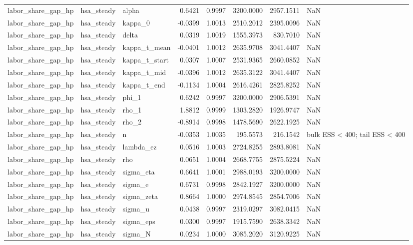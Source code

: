 \begin{tabular}{lllrrrrl}
labor\_share\_gap\_hp & hsa\_steady & alpha & 0.6421 & 0.9997 & 3200.0000 & 2957.1511 & NaN \\
labor\_share\_gap\_hp & hsa\_steady & kappa\_0 & -0.0399 & 1.0013 & 2510.2012 & 2395.0096 & NaN \\
labor\_share\_gap\_hp & hsa\_steady & delta & 0.0319 & 1.0019 & 1555.3973 & 830.7010 & NaN \\
labor\_share\_gap\_hp & hsa\_steady & kappa\_t\_mean & -0.0401 & 1.0012 & 2635.9708 & 3041.4407 & NaN \\
labor\_share\_gap\_hp & hsa\_steady & kappa\_t\_start & 0.0307 & 1.0007 & 2531.9365 & 2660.0852 & NaN \\
labor\_share\_gap\_hp & hsa\_steady & kappa\_t\_mid & -0.0396 & 1.0012 & 2635.3122 & 3041.4407 & NaN \\
labor\_share\_gap\_hp & hsa\_steady & kappa\_t\_end & -0.1134 & 1.0004 & 2616.4261 & 2825.8252 & NaN \\
labor\_share\_gap\_hp & hsa\_steady & phi\_1 & 0.6242 & 0.9997 & 3200.0000 & 2906.5391 & NaN \\
labor\_share\_gap\_hp & hsa\_steady & rho\_1 & 1.8812 & 0.9999 & 1303.2820 & 1926.9747 & NaN \\
labor\_share\_gap\_hp & hsa\_steady & rho\_2 & -0.8914 & 0.9998 & 1478.5690 & 2622.1925 & NaN \\
labor\_share\_gap\_hp & hsa\_steady & n & -0.0353 & 1.0035 & 195.5573 & 216.1542 & bulk ESS < 400; tail ESS < 400 \\
labor\_share\_gap\_hp & hsa\_steady & lambda\_ez & 0.0516 & 1.0003 & 2724.8255 & 2893.8081 & NaN \\
labor\_share\_gap\_hp & hsa\_steady & rho & 0.0651 & 1.0004 & 2668.7755 & 2875.5224 & NaN \\
labor\_share\_gap\_hp & hsa\_steady & sigma\_eta & 0.6641 & 1.0001 & 2988.0193 & 3200.0000 & NaN \\
labor\_share\_gap\_hp & hsa\_steady & sigma\_e & 0.6731 & 0.9998 & 2842.1927 & 3200.0000 & NaN \\
labor\_share\_gap\_hp & hsa\_steady & sigma\_zeta & 0.8664 & 1.0000 & 2974.8545 & 2854.7006 & NaN \\
labor\_share\_gap\_hp & hsa\_steady & sigma\_u & 0.0438 & 0.9997 & 2319.0297 & 3082.0415 & NaN \\
labor\_share\_gap\_hp & hsa\_steady & sigma\_eps & 0.0300 & 0.9997 & 1915.7590 & 2638.3342 & NaN \\
labor\_share\_gap\_hp & hsa\_steady & sigma\_N & 0.0234 & 1.0000 & 3085.2020 & 3120.9225 & NaN \\

\end{tabular}
